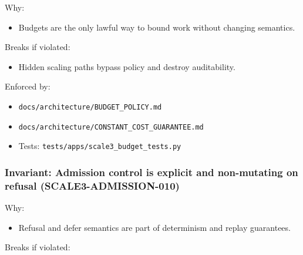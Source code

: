 \documentclass[9pt,a4paper,openany]{book}
\begin{document}
Why:



\begin{itemize}
\item Budgets are the only lawful way to bound work without changing semantics.\allowbreak{}
\end{itemize}


Breaks if violated:



\begin{itemize}
\item Hidden scaling paths bypass policy and destroy auditability.\allowbreak{}
\end{itemize}


Enforced by:



\begin{itemize}
\item \texttt{docs/\allowbreak{}architecture/\allowbreak{}BUDGET\_\allowbreak{}POLICY.\allowbreak{}md}
\end{itemize}


\begin{itemize}
\item \texttt{docs/\allowbreak{}architecture/\allowbreak{}CONSTANT\_\allowbreak{}COST\_\allowbreak{}GUARANTEE.\allowbreak{}md}
\end{itemize}


\begin{itemize}
\item Tests: \texttt{tests/\allowbreak{}apps/\allowbreak{}scale3\_\allowbreak{}budget\_\allowbreak{}tests.\allowbreak{}py}
\end{itemize}





\subsubsection{Invariant: Admission control is explicit and non-mutating on refusal (SCALE3-ADMISSION-010)}


Why:



\begin{itemize}
\item Refusal and defer semantics are part of determinism and replay guarantees.\allowbreak{}
\end{itemize}


Breaks if violated:
\end{document}
